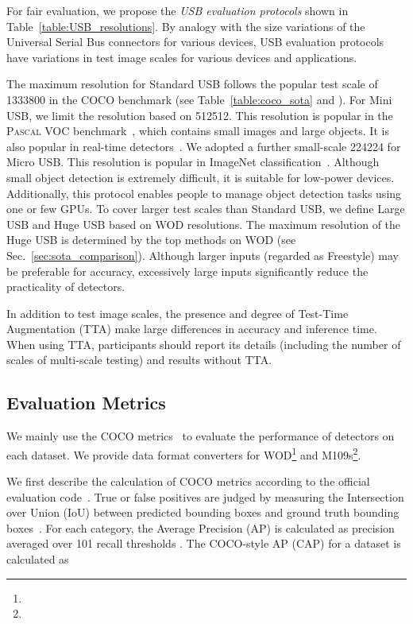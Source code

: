 \documentclass[10pt,twocolumn,letterpaper]{article}
\newcommand{\Pascal}{\textsc{Pascal}\xspace}
\newcommand{\MangasAbbr}{M109s\xspace}
\begin{document}
For fair evaluation, we propose the \textit{USB evaluation protocols} shown in Table~\ref{table:USB_resolutions}.
By analogy with the size variations of the Universal Serial Bus connectors for various devices,
USB evaluation protocols have variations in test image scales for various devices and applications.

The maximum resolution for Standard USB follows the popular test scale of 1333800 in the COCO benchmark (see Table~\ref{table:coco_sota} and \cite{MMDetection, Detectron2018}).
For Mini USB, we limit the resolution based on 512512.
This resolution is popular in the \Pascal VOC benchmark~\cite{PASCALVOC_IJCV2015, SSD_ECCV2016}, which contains small images and large objects.
It is also popular in real-time detectors~\cite{EfficientDet_CVPR2020, YOLOv4_2020}.
We adopted a further small-scale 224224 for Micro USB.
This resolution is popular in ImageNet classification~\cite{ImageNet_IJCV2015, ResNet_CVPR2016}.
Although small object detection is extremely difficult,
it is suitable for low-power devices.
Additionally, this protocol enables people to manage object detection tasks using one or few GPUs.
To cover larger test scales than Standard USB, we define Large USB and Huge USB based on WOD resolutions.
The maximum resolution of the Huge USB is determined by
the top methods on WOD (see Sec.~\ref{sec:sota_comparison}).
Although larger inputs (regarded as Freestyle) may be preferable for accuracy,
excessively large inputs significantly reduce the practicality of detectors.

In addition to test image scales,
the presence and degree of Test-Time Augmentation (TTA) make large differences in accuracy and inference time.
When using TTA,
participants should report its details (including the number of scales of multi-scale testing)
and results without TTA.





\subsection{Evaluation Metrics}

We mainly use the COCO metrics~\cite{COCO_ECCV2014, cocoapi} to evaluate the performance of detectors on each dataset.
We provide data format converters for WOD\footnote{\WaymoCOCO} and \MangasAbbr\footnote{\mangaapi}.


We first describe the calculation of COCO metrics according to the official evaluation code~\cite{cocoapi}.
True or false positives are judged by measuring the Intersection over Union (IoU)
between predicted bounding boxes and ground truth bounding boxes~\cite{PASCALVOC_IJCV2015}.
For each category,
the Average Precision (AP) is calculated as
precision averaged over 101 recall thresholds .
The COCO-style AP (CAP) for a dataset  is calculated as
\end{document}
